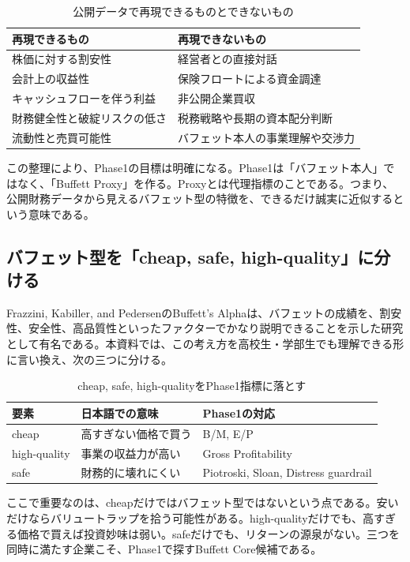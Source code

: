 \documentclass[11pt,a4paper]{article}
\begin{document}
\begin{table}[tbp]
\caption{公開データで再現できるものとできないもの}
\label{tab:replicable}
\centering
\small
\begin{tabularx}{\linewidth}{Y Y}
\toprule
再現できるもの & 再現できないもの \\
\midrule
株価に対する割安性 & 経営者との直接対話 \\
会計上の収益性 & 保険フロートによる資金調達 \\
キャッシュフローを伴う利益 & 非公開企業買収 \\
財務健全性と破綻リスクの低さ & 税務戦略や長期の資本配分判断 \\
流動性と売買可能性 & バフェット本人の事業理解や交渉力 \\
\bottomrule
\end{tabularx}
\end{table}

この整理により、Phase1の目標は明確になる。Phase1は「バフェット本人」ではなく、「Buffett Proxy」を作る。Proxyとは代理指標のことである。つまり、公開財務データから見えるバフェット型の特徴を、できるだけ誠実に近似するという意味である。

\subsection{バフェット型を「cheap, safe, high-quality」に分ける}

Frazzini, Kabiller, and PedersenのBuffett's Alphaは、バフェットの成績を、割安性、安全性、高品質性といったファクターでかなり説明できることを示した研究として有名である。本資料では、この考え方を高校生・学部生でも理解できる形に言い換え、次の三つに分ける。

\begin{table}[tbp]
\caption{cheap, safe, high-qualityをPhase1指標に落とす}
\label{tab:cheap-safe-quality}
\centering
\small
\begin{tabularx}{\linewidth}{p{25mm}Y Y}
\toprule
要素 & 日本語での意味 & Phase1の対応 \\
\midrule
cheap & 高すぎない価格で買う & B/M, E/P \\
high-quality & 事業の収益力が高い & Gross Profitability \\
safe & 財務的に壊れにくい & Piotroski, Sloan, Distress guardrail \\
\bottomrule
\end{tabularx}
\end{table}

ここで重要なのは、cheapだけではバフェット型ではないという点である。安いだけならバリュートラップを拾う可能性がある。high-qualityだけでも、高すぎる価格で買えば投資妙味は弱い。safeだけでも、リターンの源泉がない。三つを同時に満たす企業こそ、Phase1で探すBuffett Core候補である。
\end{document}
